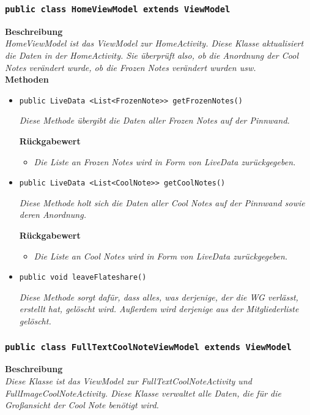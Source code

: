              
             
        \subsubsection{\texttt{public class HomeViewModel extends ViewModel}}
        \textbf{Beschreibung} \\
        \textit{HomeViewModel ist das ViewModel zur HomeActivity. Diese Klasse aktualisiert die Daten in der HomeActivity. Sie überprüft also, ob die Anordnung der Cool Notes verändert wurde, ob die Frozen Notes verändert wurden usw.}\\   
        
		\textbf{Methoden}
 			\begin{itemize}
        		\item{\texttt{public LiveData <List<FrozenNote>{}>  getFrozenNotes()}}
        	
        		\textit{Diese Methode übergibt die Daten aller Frozen Notes auf der Pinnwand.}
        
        		\textbf{Rückgabewert}
        		\begin{itemize}
        			\item\textit{Die Liste an Frozen Notes wird in Form von LiveData zurückgegeben.}
        		\end{itemize}
        	
        		\item{\texttt{public LiveData <List<CoolNote>{}> getCoolNotes()}}

        		\textit{Diese Methode holt sich die Daten aller Cool Notes auf der Pinnwand sowie deren Anordnung.}
        		
        	\textbf{Rückgabewert}
        	\begin{itemize}
        		\item\textit{Die Liste an Cool Notes wird in Form von LiveData zurückgegeben.}
			\end{itemize}	
	
			\item{\texttt{public void leaveFlateshare()}}
			
			\textit{Diese Methode sorgt dafür, dass alles, was derjenige, der die WG verlässt, erstellt hat, gelöscht wird. Außerdem wird derjenige aus der Mitgliederliste gelöscht.}
		
		\end{itemize}
        		
             
        \subsubsection{\texttt{public class FullTextCoolNoteViewModel extends ViewModel}}
        \textbf{Beschreibung} \\
        \textit{Diese Klasse ist das ViewModel zur FullTextCoolNoteActivity und FullImageCoolNoteActivity. Diese Klasse verwaltet alle Daten, die für die Großansicht der Cool Note benötigt wird.}\\
        

